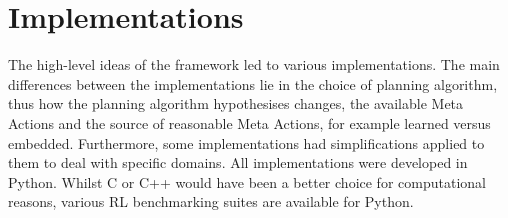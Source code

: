 \section{Implementations}
The high-level ideas of the framework led to various implementations. The main differences between the implementations lie in the choice of planning algorithm, thus how the planning algorithm hypothesises changes, the available Meta Actions and the source of reasonable Meta Actions, for example learned versus embedded. Furthermore, some implementations had simplifications applied to them to deal with specific domains. All implementations were developed in Python. Whilst C or C++ would have been a better choice for computational reasons, various RL benchmarking suites are available for Python.
